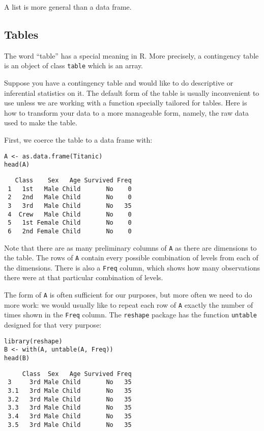 \documentclass[captions=tableheading]{scrbook}
\begin{document}
A list is more general than a data frame.
\subsection{Tables}
\label{sec-5-1-5}

The word ``table'' has a special meaning in \textsf{R}. More precisely, a contingency table is an object of class \texttt{table} which is an array.

Suppose you have a contingency table and would like to do descriptive or inferential statistics on it. The default form of the table is usually inconvenient to use unless we are working with a function specially tailored for tables. Here is how to transform your data to a more manageable form, namely, the raw data used to make the table.

First, we coerce the table to a data frame with: 


\begin{verbatim}
A <- as.data.frame(Titanic)
head(A)
\end{verbatim}

\begin{verbatim}
   Class    Sex   Age Survived Freq
 1   1st   Male Child       No    0
 2   2nd   Male Child       No    0
 3   3rd   Male Child       No   35
 4  Crew   Male Child       No    0
 5   1st Female Child       No    0
 6   2nd Female Child       No    0
\end{verbatim}

Note that there are as many preliminary columns of \texttt{A} as there are dimensions to the table. The rows of \texttt{A} contain every possible combination of levels from each of the dimensions. There is also a \texttt{Freq} column, which shows how many observations there were at that particular combination of levels. 

The form of \texttt{A} is often sufficient for our purposes, but more often we need to do more work: we would usually like to repeat each row of \texttt{A} exactly the number of times shown in the \texttt{Freq} column. The \texttt{reshape} package \cite{Wickhamreshape} has the function \texttt{untable} designed for that very purpose: 


\begin{verbatim}
library(reshape)
B <- with(A, untable(A, Freq))
head(B)
\end{verbatim}

\begin{verbatim}
     Class  Sex   Age Survived Freq
 3     3rd Male Child       No   35
 3.1   3rd Male Child       No   35
 3.2   3rd Male Child       No   35
 3.3   3rd Male Child       No   35
 3.4   3rd Male Child       No   35
 3.5   3rd Male Child       No   35
\end{verbatim}
\end{document}
